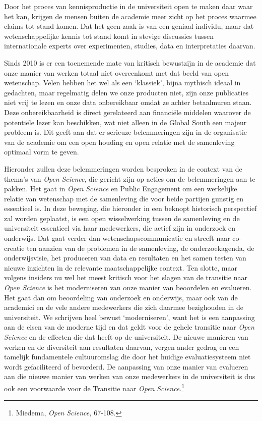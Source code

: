 \documentclass[smallauthor, chapterhaspagenum, nochapterinheader, pagenuminheader,  bigchapnum,medium2, tocpages, garamond, titleinheader]{jote-book}
\begin{document}
	Door het proces van kennisproductie in de universiteit open te maken daar waar het kan, krijgen de mensen buiten de academie meer zicht op het proces waarmee claims tot stand komen. Dat het geen zaak is van een geniaal individu, maar dat wetenschappelijke kennis tot stand komt in stevige discussies tussen internationale experts over experimenten, studies, data en interpretaties daarvan.



	Sinds 2010 is er een toenemende mate van kritisch bewustzijn in de academie dat onze manier van werken totaal niet overeenkomt met dat beeld van open wetenschap. Velen hebben het wel als een ‘klassiek', bijna mythisch ideaal in gedachten, maar regelmatig delen we onze producten niet, zijn onze publicaties niet vrij te lezen en onze data onbereikbaar omdat ze achter betaalmuren staan. Deze onbereikbaarheid is direct gerelateerd aan financiële middelen waarover de potentiële lezer kan beschikken, wat niet alleen in de Global South een majeur probleem is. Dit geeft aan dat er serieuze belemmeringen zijn in de organisatie van de academie om een open houding en open relatie met de samenleving optimaal vorm te geven.



	Hieronder zullen deze belemmeringen worden besproken in de context van de thema's van \emph{Open }\emph{Science}, die gericht zijn op acties om de belemmeringen aan te pakken. Het gaat in \emph{Open }\emph{Science} en Public Engagement om een werkelijke relatie van wetenschap met de samenleving die voor beide partijen gunstig en essentieel is. In deze beweging, die hieronder in een beknopt historisch perspectief zal worden geplaatst, is een open wisselwerking tussen de samenleving en de universiteit essentieel via haar medewerkers, die actief zijn in onderzoek en onderwijs. Dat gaat verder dan wetenschapscommunicatie en streeft naar co-creatie ten aanzien van de problemen in de samenleving, de onderzoekagenda, de onderwijsvisie, het produceren van data en resultaten en het samen testen van nieuwe inzichten in de relevante maatschappelijke context. Ten slotte, maar volgens insiders nu wel het meest kritisch voor het slagen van de transitie naar \emph{Open }\emph{Science} is het moderniseren van onze manier van beoordelen en evalueren. Het gaat dan om beoordeling van onderzoek en onderwijs, maar ook van de academici en de vele andere medewerkers die zich daarmee bezighouden in de universiteit. We schrijven heel bewust ‘moderniseren', want het is een aanpassing aan de eisen van de moderne tijd en dat geldt voor de gehele transitie naar \emph{Open }\emph{Science} en de effecten die dat heeft op de universiteit. De nieuwe manieren van werken en de diversiteit aan resultaten daarvan, vergen ander gedrag en een tamelijk fundamentele cultuuromslag die door het huidige evaluatiesysteem niet wordt gefaciliteerd of bevorderd. De aanpassing van onze manier van evalueren aan die nieuwe manier van werken van onze medewerkers in de universiteit is dus ook een voorwaarde voor de Transitie naar \emph{Open }\emph{Science}.\footnote{Miedema, \emph{Open }\emph{Science}\emph{, }67-108.}
\end{document}
